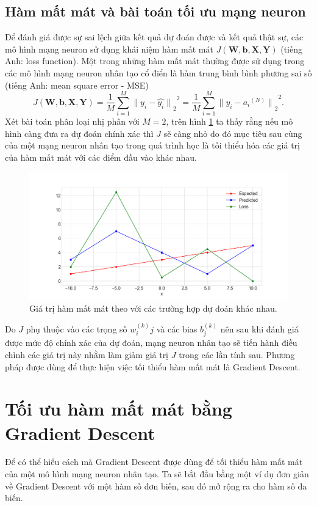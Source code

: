 \subsection{Hàm mất mát và bài toán tối ưu mạng neuron}
Để đánh giá được sự sai lệch giữa kết quả dự đoán được và kết quả thật sự, các mô hình mạng neuron sử dụng khái niệm hàm mất mát $J\left(
		{\boldsymbol{W}},{\boldsymbol{b}},{\boldsymbol{X}},{\boldsymbol{Y}}
	\right)$ 
(tiếng Anh: loss function). Một trong những hàm mất mát thường được sử dụng trong các mô hình mạng neuron nhân tạo cổ điển là hàm trung bình bình phương sai số (tiếng Anh: mean square error - MSE)
\begin{equation}
	J
	\left(
		{\boldsymbol{W}},{\boldsymbol{b}},{\boldsymbol{X}},{\boldsymbol{Y}}
	\right)
	=
	{
		{\frac{1}{M}} 
		{\sum_{i=1}^{M}} 
		{ { {\parallel} y_i - \widehat{y_i} {\parallel} }_2 }^2
	}
	=
	{
		{\frac{1}{M}} 
		{\sum_{i=1}^{M}} 
		{ { {\parallel} y_i - {a_i}^{(N)} {\parallel} }_2 }^2
	}.
\end{equation}
Xét bài toán phân loại nhị phân với $M=2$, trên hình \ref{fig:loss_function} ta thấy rằng nếu mô hình càng đưa ra dự đoán chính xác thì $J$ sẽ càng nhỏ do đó mục tiêu sau cùng của một mạng neuron nhân tạo trong quá trình học là tối thiểu hóa các giá trị của hàm mất mát với các điểm đầu vào khác nhau.
\begin{figure}[ht!]
	\centerline{\includegraphics[scale=0.4]{images/loss_function.png}}
  	\caption{Giá trị hàm mất mát theo với các trường hợp dự đoán khác nhau.}
  	\label{fig:loss_function}
\end{figure}
Do $J$ phụ thuộc vào các trọng số $w^{(k)}_ij$ và các bias $b^{(k)}_j$ nên sau khi đánh giá được mức độ chính xác của dự đoán, mạng neuron nhân tạo sẽ tiến hành điều chỉnh các giá trị này nhằm làm giảm giá trị $J$ trong các lần tính sau. Phương pháp được dùng để thực hiện việc tối thiểu hàm mất mát là Gradient Descent.
\section{Tối ưu hàm mất mát bằng Gradient Descent}
Để có thể hiểu cách mà Gradient Descent\cite[p.158-174]{tiep:2017} được dùng để tối thiểu hàm mất mát của một mô hình mạng neuron nhân tạo. Ta sẽ bắt đầu bằng một ví dụ đơn giản về Gradient Descent với một hàm số đơn biến, sau đó mở rộng ra cho hàm số đa biến.
